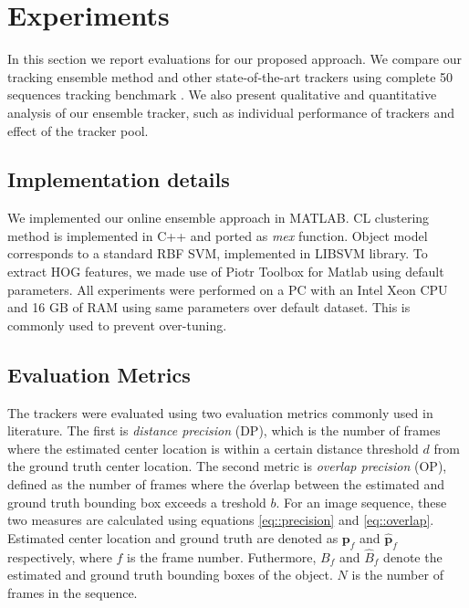 \chapter{Experiments} %

\label{chapter4} %

\label{chapter::experiments}

In this section we report evaluations for our proposed approach. We compare our
tracking ensemble method and other state-of-the-art trackers using complete
50 sequences tracking benchmark \cite{Wu2013}. We also present qualitative and
quantitative analysis of our ensemble tracker, such as
individual performance of trackers and effect of the tracker pool.

\section{Implementation details}
We implemented our online ensemble approach in MATLAB. CL clustering method is
implemented in C++ and ported as \textit{mex} function. Object model corresponds
to a standard RBF SVM, implemented in LIBSVM library. To extract HOG features,
we made use of Piotr Toolbox for Matlab using default parameters. All
experiments were performed on a PC with an Intel Xeon CPU and 16 GB of RAM using
same parameters over default dataset. This is commonly used to prevent
over-tuning.

\section{Evaluation Metrics}
The trackers were evaluated using two evaluation metrics commonly used in
literature. The first is \textit{distance precision} (DP), which is the number
of frames where the estimated center location is within a certain distance
threshold $d$ from the ground truth center location. The second metric is
\textit{overlap precision} (OP), defined as the number of frames where the
óverlap between the estimated and ground truth bounding box exceeds
a treshold $b$. For an image sequence, these two measures are calculated using
equations \ref{eq::precision} and \ref{eq::overlap}. Estimated center location
and ground truth are denoted as $\mathbf{p}_f$ and $\mathbf{\hat{p}}_f$
respectively, where $f$ is the frame number. Futhermore, $B_f$ and $\hat{B}_f$
denote the estimated and ground truth bounding boxes of the object. $N$ is the
number of frames in the sequence.

